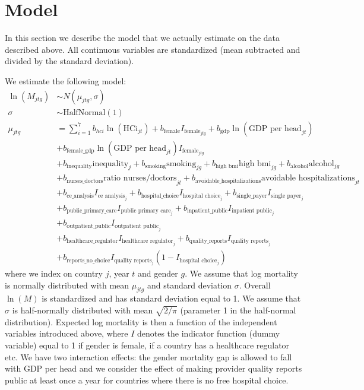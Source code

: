 \documentclass[a4paper,12pt]{article}
\begin{document}
\section{Model}
\label{sec:org72cb1df}

In this section we describe the model that we actually estimate on the data described above.  All continuous variables are standardized (mean subtracted and divided by the standard deviation).

We estimate the following model:
\begin{align*}
\ln(M_{jtg}) &\sim N(\mu_{jtg},\sigma) \\
\sigma & \sim\text{HalfNormal}(1) \\
\mu_{jtg} &= \sum_{i=1}^7 b_{hci} \ln(\text{HCi}_{jt}) + b_{\text{female}} I_{\text{female}_{jtg}} + b_{\text{gdp}} \ln(\text{GDP per head}_{jt}) \\
 & + b_{\text{female\_gdp}} \ln(\text{GDP per head}_{jt})  I_{\text{female}_{jtg}} \\
 & + b_{\text{inequality}} \text{inequality}_{j} + b_{\text{smoking}} \text{smoking}_{jg}+ b_{\text{high bmi}} \text{high bmi}_{jg}+ b_{\text{alcohol}} \text{alcohol}_{jg} \\
 & + b_{\text{nurses\_doctors}} \text{ratio nurses/doctors}_{jt} + b_{\text{avoidable\_hospitalizations}} \text{avoidable hospitalizations}_{jt} \\
 & + b_{\text{ce\_analysis}} I_{\text{ce analysis}_{j}} +  b_{\text{hospital\_choice}} I_{\text{hospital choice}_{j}} + b_{\text{single\_payer}} I_{\text{single payer}_{j}} \\
 & +  b_{\text{public\_primary\_care}} I_{\text{public primary care}_j} + b_{\text{inpatient\_public}} I_{\text{inpatient public}_{j}} \\
 & + b_{\text{outpatient\_public}} I_{\text{outpatient public}_j} \\
 & + b_{\text{healthcare\_regulator}} I_{\text{healthcare regulator}_j} + b_{\text{quality\_reports}} I_{\text{quality reports}_j} \\
 & + b_{\text{reports\_no\_choice}} I_{\text{quality reports}_j} (1-I_{\text{hospital choice}_j})
\end{align*}
where we index on country \(j\), year \(t\) and gender \(g\). We assume that log mortality is normally distributed with mean \(\mu_{jtg}\) and standard deviation \(\sigma\). Overall \(\ln(M)\) is standardized and has standard deviation equal to 1. We assume that \(\sigma\) is half-normally distributed with mean \(\sqrt{2/\pi}\) (parameter 1 in the half-normal distribution). Expected log mortality is then a function of the independent variables introduced above, where \(I\) denotes the indicator function (dummy variable) equal to 1 if gender is female, if a country has a healthcare regulator etc. We have two interaction effects: the gender mortality gap is allowed to fall with GDP per head and we consider the effect of making provider quality reports public at least once a year for countries where there is no free hospital choice.
\end{document}
